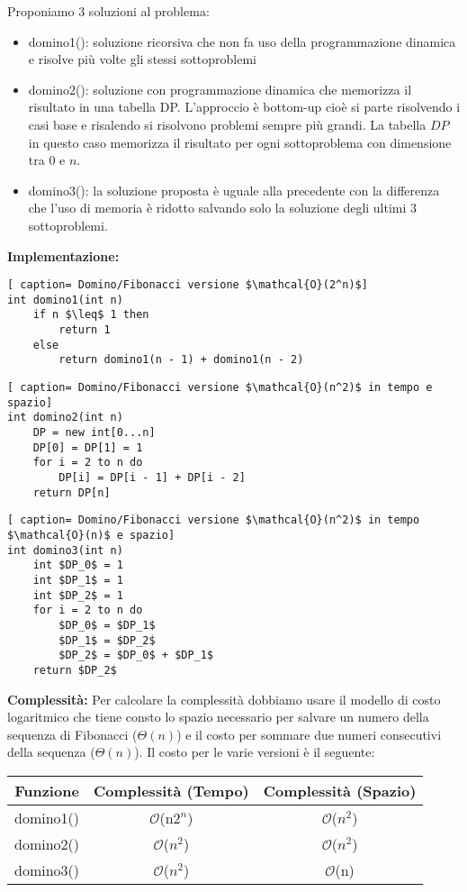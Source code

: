 \documentclass[../cheatSheetAlgoritmi.tex]{subfiles}
\begin{document}
Proponiamo 3 soluzioni al problema:
\begin{itemize}
	\item domino1(): soluzione ricorsiva che non fa uso della programmazione dinamica e risolve più volte gli stessi sottoproblemi
	\item domino2(): soluzione con programmazione dinamica che memorizza il risultato in una tabella DP. L'approccio è bottom-up cioè si parte risolvendo i casi base e risalendo si risolvono problemi sempre più grandi. La tabella $DP$ in questo caso memorizza il risultato per ogni sottoproblema con dimensione tra 0 e $n$.
	\item domino3(): la soluzione proposta è uguale alla precedente con la differenza che l'uso di memoria è ridotto salvando solo la soluzione degli ultimi 3 sottoproblemi. 
\end{itemize}
\newpage
\noindent
\textbf{Implementazione:}
\begin{lstlisting}[ caption= Domino/Fibonacci versione $\mathcal{O}(2^n)$]
int domino1(int n)
	if n $\leq$ 1 then
		return 1
	else
		return domino1(n - 1) + domino1(n - 2)
\end{lstlisting}

\begin{lstlisting}[ caption= Domino/Fibonacci versione $\mathcal{O}(n^2)$ in tempo e spazio]
int domino2(int n)
	DP = new int[0...n]
	DP[0] = DP[1] = 1
	for i = 2 to n do
		DP[i] = DP[i - 1] + DP[i - 2]
	return DP[n]
\end{lstlisting}

\begin{lstlisting}[ caption= Domino/Fibonacci versione $\mathcal{O}(n^2)$ in tempo $\mathcal{O}(n)$ e spazio]
int domino3(int n)
	int $DP_0$ = 1
	int $DP_1$ = 1
	int $DP_2$ = 1
	for i = 2 to n do
		$DP_0$ = $DP_1$
		$DP_1$ = $DP_2$
		$DP_2$ = $DP_0$ + $DP_1$
	return $DP_2$
\end{lstlisting}
\textbf{Complessità:} Per calcolare la complessità dobbiamo usare il modello di costo logaritmico che tiene consto lo spazio necessario per salvare un numero della sequenza di Fibonacci ($\Theta(n)$) e il costo per sommare due numeri consecutivi della sequenza ($\Theta(n)$). 
Il costo per le varie versioni è il seguente: 
\begin{center}
	\renewcommand{\arraystretch}{1.2}
	\begin{tabular}{ |c|c|c|} 
		\hline
			Funzione & Complessità (Tempo) & Complessità (Spazio)\\ 
		\hline
			domino1() & $\mathcal{O}$(n$2^{n}$) &  $\mathcal{O}$($n^{2}$)\\ 
		\hline
			domino2() &  $\mathcal{O}$($n^{2}$) &  $\mathcal{O}$($n^{2}$) \\
		\hline
			domino3() &  $\mathcal{O}$($n^{2}$) &  $\mathcal{O}$(n) \\
		\hline
	\end{tabular}
\end{center} \
\end{document}
